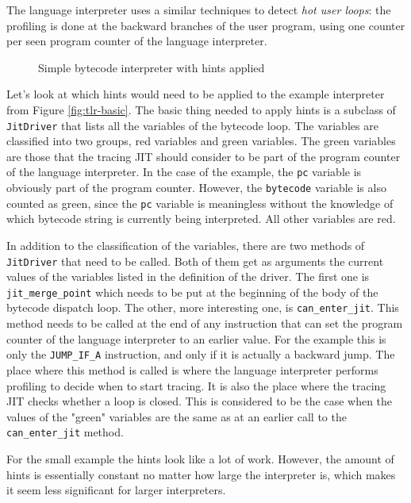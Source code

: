 \documentclass{acm_proc_article-sp}
\newcommand\fijal[1]{\nb{FIJAL}{#1}}
\begin{document}
The language interpreter uses a similar techniques to detect \emph{hot user
loops}: the profiling is done at the backward branches of the user program,
using one counter per seen program counter of the language interpreter.

\begin{figure}

\caption{Simple bytecode interpreter with hints applied}
\label{fig:tlr-full}
\end{figure}

\fijal{Stopped reading at that point}
Let's look at which hints would need to be applied to the example interpreter
from Figure \ref{fig:tlr-basic}. The basic thing needed to apply hints is a
subclass of \texttt{JitDriver} that lists all the variables of the bytecode
loop. The variables are classified into two groups, red variables and green
variables. The green variables are those that the tracing JIT should consider to
be part of the program counter of the language interpreter. In the case of the
example, the \texttt{pc} variable is obviously part of the program counter.
However, the \texttt{bytecode} variable is also counted as green, since the
\texttt{pc} variable is meaningless without the knowledge of which bytecode
string is currently being interpreted. All other variables are red.

In addition to the classification of the variables, there are two methods of
\texttt{JitDriver} that need to be called. Both of them get as arguments the
current values of the variables listed in the definition of the driver. The
first one is \texttt{jit\_merge\_point} which needs to be put at the beginning
of the body of the bytecode dispatch loop. The other, more interesting one, is
\texttt{can\_enter\_jit}. This method needs to be called at the end of any
instruction that can set the program counter of the language interpreter to an
earlier value. For the example this is only the \texttt{JUMP\_IF\_A}
instruction, and only if it is actually a backward jump. The place where this
method is called is where the language interpreter performs profiling to decide
when to start tracing. It is also the place where the tracing JIT checks
whether a loop is closed. This is considered to be the case when the values of
the "green" variables are the same as at an earlier call to the
\texttt{can\_enter\_jit} method.

For the small example the hints look like a lot of work. However, the amount of
hints is essentially constant no matter how large the interpreter is, which
makes it seem less significant for larger interpreters.
\end{document}
